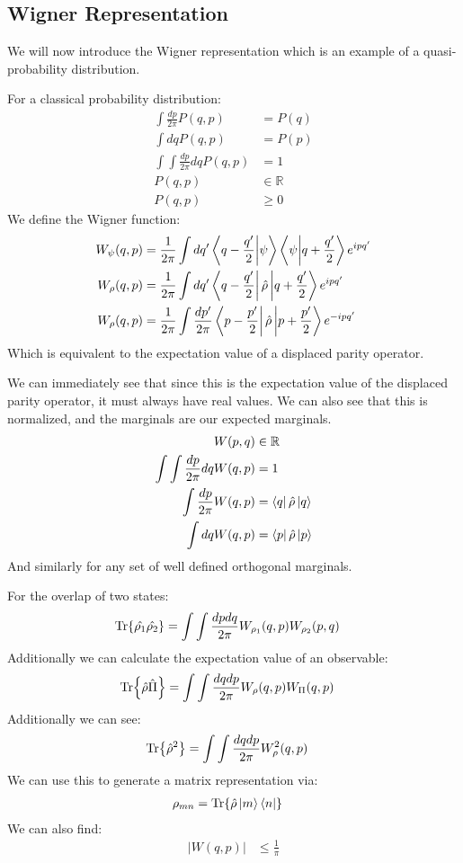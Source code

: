 \subsection{Wigner Representation}
We will now introduce the Wigner representation which is an example of a quasi-probability distribution.

For a classical probability distribution:
\begin{align*}
	\int \frac{dp}{2\pi} P(q,p) &= P(q) \\
	\int dq P(q,p)&= P(p) \\
	\int\int \frac{dp}{2\pi}dq P(q,p) &= 1 \\
	P(q,p) &\in \mathbb{R} \\
	P(q,p) & \geq 0
\end{align*}
We define the Wigner function:
\begin{align*}
	W_\psi(q,p) &= \frac{1}{2\pi} \int dq' \bra{q - \frac{q'}{2}}\ket{\psi}\bra{\psi}\ket{q + \frac{q'}{2}} e^{ipq'} \\
	W_\rho(q,p) &= \frac{1}{2\pi} \int dq' \bra{q - \frac{q'}{2}}\hat{\rho}\ket{q + \frac{q'}{2}} e^{ipq'} \\
	W_\rho(q,p) &= \frac{1}{2\pi} \int \frac{dp'}{2\pi} \bra{p - \frac{p'}{2}}\hat{\rho}\ket{p + \frac{p'}{2}} e^{-ipq'}
\end{align*}
Which is equivalent to the expectation value of a displaced parity operator.

We can immediately see that since this is the expectation value of the displaced parity operator, it must always have real values.
We can also see that this is normalized, and the marginals are our expected marginals.
\begin{align*}
	W(p,q) &\in \mathbb{R} \\
	\int\int \frac{dp}{2\pi}dq W(q,p) &= 1 \\
	\int \frac{dp}{2\pi} W(q,p) &= \bra{q}\hat{\rho}\ket{q} \\
	\int dq W(q,p)&= \bra{p}\hat{\rho}\ket{p}
\end{align*}
And similarly for any set of well defined orthogonal marginals. 

For the overlap of two states:
\begin{align*}
	\Tr{\hat{\rho_1}\hat{\rho_2}} &= \int\int \frac{dpdq}{2\pi} W_{\rho_1}(q,p)W_{\rho_2}(p,q)
\end{align*}
Additionally we can calculate the expectation value of an observable:
\begin{align*}
	\Tr{\hat{\rho}\hat{\Pi}} &= \int \int \frac{dqdp}{2\pi} W_\rho(q,p) W_\Pi(q,p)
\end{align*}
Additionally we can see:
\begin{align*}
	\Tr{\hat{\rho}^2} &= \int\int \frac{dqdp}{2\pi} W_\rho^2(q,p)
\end{align*}
We can use this to generate a matrix representation via:
\begin{align*}
	\rho_{mn} &=\Tr{\hat{\rho}\ket{m}\bra{n}}
\end{align*}
We can also find:
\begin{align*}
	|W(q,p)| &\leq \frac{1}{\pi}
\end{align*}

